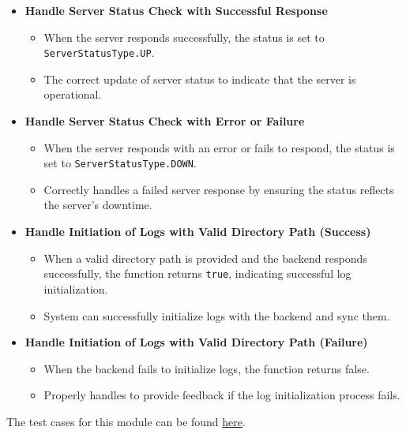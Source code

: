 \documentclass[12pt, titlepage]{article}
\begin{document}
  \begin{itemize}
    \item \textbf{Handle Server Status Check with Successful Response}
      \begin{itemize}
        \item When the server responds successfully, the status is
          set to \texttt{ServerStatusType.UP}.
        \item The correct update of server status to indicate that
          the server is operational.
      \end{itemize}

    \item \textbf{Handle Server Status Check with Error or Failure}
      \begin{itemize}
        \item When the server responds with an error or fails to
          respond, the status is set to \texttt{ServerStatusType.DOWN}.
        \item Correctly handles a failed server response by ensuring
          the status reflects the server's downtime.
      \end{itemize}

    \item \textbf{Handle Initiation of Logs with Valid Directory Path (Success)}
      \begin{itemize}
        \item When a valid directory path is provided and the backend
          responds successfully, the function returns \texttt{true},
          indicating successful log initialization.
        \item System can successfully initialize logs with the
          backend and sync them.
      \end{itemize}

    \item \textbf{Handle Initiation of Logs with Valid Directory Path (Failure)}
      \begin{itemize}
        \item When the backend fails to initialize logs, the function
          returns false.
        \item Properly handles to provide feedback if the log
          initialization process fails.
      \end{itemize}
  \end{itemize}

  \noindent The test cases for this module can be found
  \href{https://github.com/ssm-lab/capstone--sco-vs-code-plugin/blob/plugin-multi-file/test/api/backend.test.ts}{here}.
\end{document}
